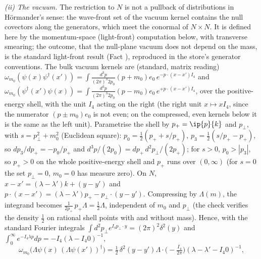\emph{(ii) The vacuum.} The restriction to $N$ is not a pullback of distributions in H\"ormander's sense: the wave-front set of the vacuum kernel contains the null covectors along the generators, which meet the conormal of $N\times N$. It is defined here by the momentum-space (light-front) computation below, with transverse smearing; the outcome, that the null-plane vacuum does not depend on the mass, is the standard light-front result (Fact ), reproduced in the store's generator conventions. The bulk vacuum kernels are (standard, matrix reading) $\omega_{m_{0}}(\psi(x)\psi^{\dagger}(x')) = \int\frac{d^{3}p}{(2\pi)^{3}2p_{0}}(p + m_{0})e_{0}\,e^{-p\cdot(x - x')I_{4}}$ and $\omega_{m_{0}}(\psi^{\dagger}(x')\psi(x)) = \int\frac{d^{3}p}{(2\pi)^{3}2p_{0}}(p - m_{0})e_{0}\,e^{+p\cdot(x - x')I_{4}}$, over the positive-energy shell, with the unit $I_{4}$ acting on the right (the right unit $x \mapsto xI_{4}$, since the numerator $(p \pm m_{0})e_{0}$ is not even; on the compressed, even kernels below it is the same as the left unit). Parametrise the shell by $p_{+} = \ip{p}{k}$ and $p_{\perp}$, with $s = p_{\perp}^{2} + m_{0}^{2}$ (Euclidean square): $p_{0} = \tfrac12(p_{+} + s/p_{+})$, $p_{3} = \tfrac12(s/p_{+} - p_{+})$, so $dp_{3}/dp_{+} = -p_{0}/p_{+}$ and $d^{3}p/(2p_{0}) = dp_{+}\,d^{2}p_{\perp}/(2p_{+})$; for $s > 0$, $p_{0} > |p_{3}|$, so $p_{+} > 0$ on the whole positive-energy shell and $p_{+}$ runs over $(0, \infty)$ (for $s = 0$ the set $p_{\perp} = 0$, $m_{0} = 0$ has measure zero). On $N$, $x - x' = (\lambda - \lambda')k + (y - y')$ and $p\cdot(x - x') = (\lambda - \lambda')p_{+} - p_{\perp}\cdot(y - y')$. Compressing by $\Lambda(m)$, the integrand becomes $\tfrac{1}{2p_{+}}\,p_{+}\Lambda = \tfrac12\Lambda$, independent of $m_{0}$ and $p_{\perp}$ (the check verifies the density $\tfrac12$ on rational shell points with and without mass). Hence, with the standard Fourier integrals $\int d^{2}p_{\perp}e^{I_{4}p_{\perp}\cdot y} = (2\pi)^{2}\delta^{2}(y)$ and $\int_{0}^{\infty}e^{-I_{4}\lambda p}dp = -I_{4}(\lambda - I_{4}0)^{-1}$,
\[
\omega_{m_{0}}\big(\Lambda\psi(x)\,(\Lambda\psi(x'))^{\dagger}\big) = \tfrac12\,\delta^{2}(y - y')\Lambda\cdot\Big(-\tfrac{I_{4}}{2\pi}\Big)(\lambda - \lambda' - I_{4}0)^{-1},
\]
